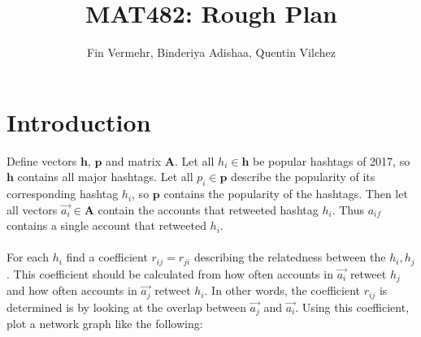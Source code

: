 \documentclass[11pt]{article}
\theoremstyle{plain}
\theoremstyle{definition}
\begin{document}
 


\title{MAT482: Rough Plan}
\author{Fin Vermehr, Binderiya Adishaa, Quentin Vilchez}
\maketitle

\section{Introduction}

Define vectors $\textbf{h}$, $\textbf{p}$ and matrix $\textbf{A}$. Let all $ h_i \in \textbf{h}$ be popular hashtags of 2017, so $\textbf{h}$ contains all major hashtags. Let all $p_i \in \textbf{p}$ describe the popularity of its corresponding hashtag $h_i$, so $\textbf{p}$ contains the popularity of the hashtags. Then let all vectors $\vec{a_i} \in \textbf{A}$ contain the accounts that retweeted hashtag $h_i$. Thus $a_{if}$ contains a single account that retweeted $h_i$.\\
\\
For each $h_i$ find a coefficient $r_{ij} = r_{ji}$ describing the relatedness between the $h_i, h_j$. This coefficient should be calculated from how often accounts in $\vec{a_i}$ retweet $h_j$ and how often accounts in $\vec{a_j}$ retweet $h_i$. In other words, the coefficient ${r}_{ij}$ is determined is by looking at the overlap between $\vec{a_j}$ and $\vec{a_i}$. Using this coefficient, plot a network graph like the following:
\end{document}

